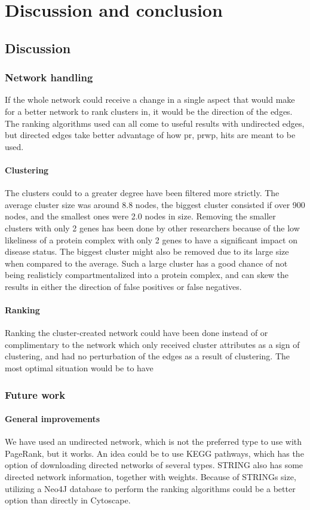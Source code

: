 \part{Discussion and conclusion}
\label{pa:conclusion}
\chapter{Discussion}
\section{Network handling}
If the whole network could receive a change in a single aspect that would make
for a better network to rank clusters in, it would be the direction of the
edges. The ranking algorithms used can all come to useful results with
undirected edges, but directed edges take better advantage of how \gls{pr},
\gls{prwp}, \gls{hits} are meant to be used.

\subsection{Clustering}
The clusters could to a greater degree have been filtered more strictly. The
average cluster size was around 8.8 nodes, the biggest cluster consisted if over
900 nodes, and the smallest ones were 2.0 nodes in size. Removing the smaller
clusters with only 2 genes has been done by other researchers because of the low
likeliness of a protein complex with only 2 genes to have a significant impact
on disease status. The biggest cluster might also be removed due to its large
size when compared to the average. Such a large cluster has a good chance of not
being realisticly compartmentalized into a protein complex, and can skew the
results in either the direction of false positives or false negatives.

\subsection{Ranking}
Ranking the cluster-created network could have been done instead of or
complimentary to the network which only received cluster attributes as a sign
of clustering, and had no perturbation of the edges as a result of clustering.
The most optimal situation would be to have 

\section{Future work}
\subsection{General improvements}
We have used an undirected network, which is not the preferred type to use with
PageRank, but it works. An idea could be to use KEGG pathways\cite{kegg}, which
has the option of downloading directed networks of several types.
STRING\cite{str} also has some directed network information, together with
weights. Because of STRINGs size, utilizing a Neo4J database to perform the
ranking algorithms could be a better option than directly in Cytoscape.

